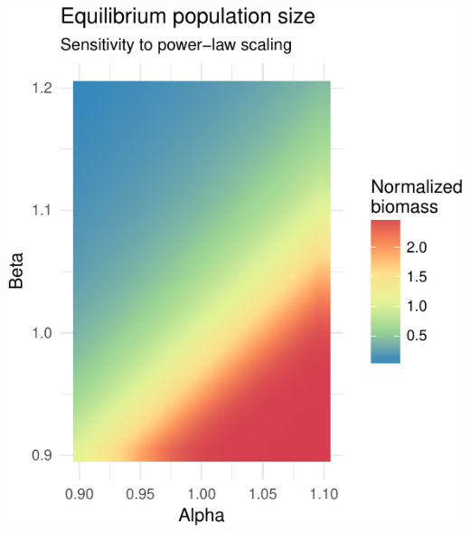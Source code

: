 \documentclass[]{article}
\begin{document}
\includegraphics{eq_pop_files/figure-latex/unnamed-chunk-5-1.pdf}
\end{document}
